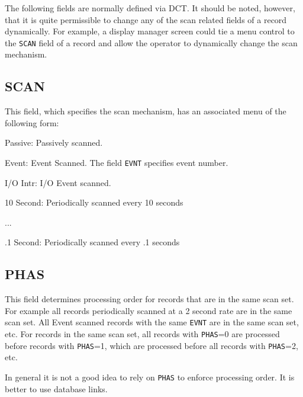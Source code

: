 The following fields are normally defined via DCT.
It should be noted, however, that it is quite permissible to change any of the scan related fields of a record dynamically.
For example, a display manager screen could tie a menu control to the \verb|SCAN| field of a record and allow the operator to dynamically change the scan mechanism.

\subsection{SCAN}

This field, which specifies the scan mechanism, has an associated menu of the following form:

\begin{description}
\item {}Passive: Passively scanned.

\item {}Event: Event Scanned. The field \verb|EVNT| specifies event number.

\item {}I/O Intr: I/O Event scanned.

\item 10 Second: Periodically scanned every 10 seconds

\item ...

\item .1 Second: Periodically scanned every .1 seconds

\end{description}

\subsection{PHAS}

This field determines processing order for records that are in the same scan set.
For example all records periodically scanned at a 2 second rate are in the same scan set.
All Event scanned records with the same \verb|EVNT| are in the same scan set, etc.
For records in the same scan set, all records with \verb|PHAS|=0 are processed before records with \verb|PHAS|=1, which are processed before all records with \verb|PHAS|=2, etc.

In general it is not a good idea to rely on \verb|PHAS| to enforce processing order.
It is better to use database links.

